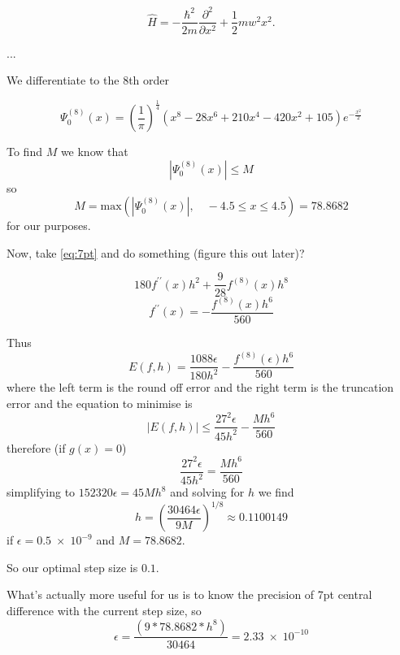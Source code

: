 \begin{equation}
\hat{H} = -\frac{\hbar^2}{2m}\frac{\partial^2}{\partial x^2}+\frac{1}{2}mw^2x^2.
\end{equation}

...

We differentiate to the 8th order

\begin{equation}
\Psi_0^{(8)}(x) = \left(\frac{1}{\pi}\right)^{\frac{1}{4}}\left(x^8-28x^6+210x^4-420x^2+105\right)e^{-\frac{x^2}{2}}
\label{eq:7pt}
\end{equation}

To find $M$ we know that
\begin{equation}
 \left|\Psi_0^{(8)}(x)\right| \leq M
\end{equation}
so
\begin{equation}
M = \mathrm{max}\left(\left|\Psi_0^{(8)}(x)\right|, \quad -4.5 \leq x \leq 4.5\right) = 78.8682
\end{equation}
for our purposes.


Now, take \cref{eq:7pt} and do something (figure this out later)?

\begin{equation}
180f^{\prime\prime}(x)h^2+\frac{9}{28}f^{(8)}(x)h^8
\end{equation}
\begin{equation}
  f^{\prime\prime}(x)=-\frac{f^{(8)}(x)h^6}{560}
\end{equation}

Thus
\begin{equation}
  E(f,h) = \frac{1088\epsilon}{180h^2}-\frac{f^{(8)}(\epsilon)h^6}{560}
\end{equation}
where the left term is the round off error and the right term is the truncation error and the equation to minimise is
\begin{equation}
  \left|E(f,h)\right| \leq \frac{27^2\epsilon}{45h^2}-\frac{Mh^6}{560}
\end{equation}
therefore (if $g(x) = 0$)
\begin{equation}
  \frac{27^2\epsilon}{45h^2}=\frac{Mh^6}{560}
\end{equation}
simplifying to $152320\epsilon = 45Mh^8$ and solving for $h$ we find
\begin{equation}
  h = \left(\frac{30464\epsilon}{9M}\right)^{1/8} \approx 0.1100149
\end{equation}
if $\epsilon = 0.5\;\times\;10^{-9}$ and $M = 78.8682$.

So our optimal step size is $0.1$.

What's actually more useful for us is to know the precision of 7pt central difference with the current step size, so
\begin{equation}
\epsilon = \frac{\left(9*78.8682*h^8\right)}{30464} = 2.33\;\times\;10^{-10}
\end{equation}